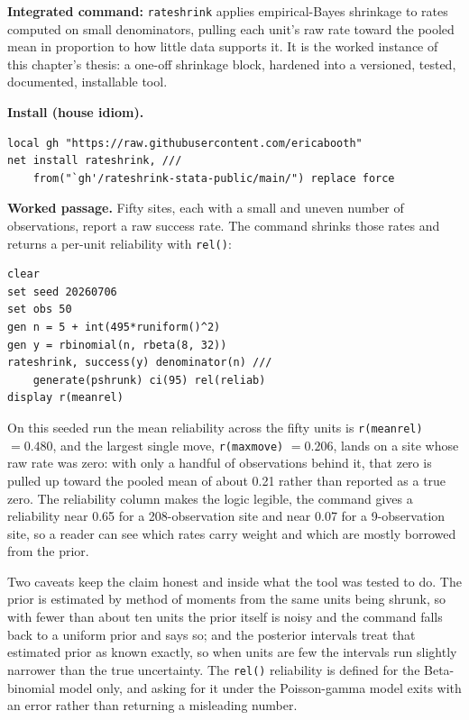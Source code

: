\begin{kaobox}[frametitle=Package Integration: \texttt{rateshrink}]
\textbf{Integrated command:} \texttt{rateshrink} applies empirical-Bayes shrinkage to rates computed on small denominators, pulling each unit's raw rate toward the pooled mean in proportion to how little data supports it. It is the worked instance of this chapter's thesis: a one-off shrinkage block, hardened into a versioned, tested, documented, installable tool.

\medskip
\textbf{Install (house idiom).}
\par
{\footnotesize
\begin{verbatim}
local gh "https://raw.githubusercontent.com/ericabooth"
net install rateshrink, ///
    from("`gh'/rateshrink-stata-public/main/") replace force
\end{verbatim}
}

\textbf{Worked passage.} Fifty sites, each with a small and uneven number of observations, report a raw success rate. The command shrinks those rates and returns a per-unit reliability with \texttt{rel()}:
\par
{\footnotesize
\begin{verbatim}
clear
set seed 20260706
set obs 50
gen n = 5 + int(495*runiform()^2)
gen y = rbinomial(n, rbeta(8, 32))
rateshrink, success(y) denominator(n) ///
    generate(pshrunk) ci(95) rel(reliab)
display r(meanrel)
\end{verbatim}
}
On this seeded run the mean reliability across the fifty units is \texttt{r(meanrel)} $= 0.480$, and the largest single move, \texttt{r(maxmove)} $= 0.206$, lands on a site whose raw rate was zero: with only a handful of observations behind it, that zero is pulled up toward the pooled mean of about 0.21 rather than reported as a true zero. The reliability column makes the logic legible, the command gives a reliability near 0.65 for a 208-observation site and near 0.07 for a 9-observation site, so a reader can see which rates carry weight and which are mostly borrowed from the prior.
\end{kaobox}

Two caveats keep the claim honest and inside what the tool was tested to do. The prior is estimated by method of moments from the same units being shrunk, so with fewer than about ten units the prior itself is noisy and the command falls back to a uniform prior and says so; and the posterior intervals treat that estimated prior as known exactly, so when units are few the intervals run slightly narrower than the true uncertainty. The \texttt{rel()} reliability is defined for the Beta-binomial model only, and asking for it under the Poisson-gamma model exits with an error rather than returning a misleading number.

